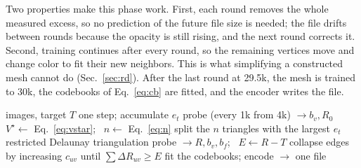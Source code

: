Two properties make this phase work. First, each round removes the whole measured excess, so no prediction of the future file size is needed; the file drifts between rounds because the opacity is still rising, and the next round corrects it. Second, training continues after every round, so the remaining vertices move and change color to fit their new neighbors. This is what simplifying a constructed mesh cannot do (Sec.~\ref{sec:rd}). After the last round at 29.5k, the mesh is trained to 30k, the codebooks of Eq.~\eqref{eq:cb} are fitted, and the encoder writes the file.

\begin{algorithm}[t]
\caption{\BM for a target file size $T$}
\label{alg:bm}
\small
\begin{algorithmic}[1]
\Require images, target $T$
  \State one \MS step; accumulate $e_t$
    \State probe (every 1k from 4k) $\rightarrow b_v, R_0$
    \State $V^\star \gets$ Eq.~\eqref{eq:vstar}; \ $n \gets$ Eq.~\eqref{eq:n}
    \State split the $n$ triangles with the largest $e_t$
  \EndIf
   restricted Delaunay triangulation \EndIf
    \State probe $\rightarrow R, b_v, b_f$; \ $E \gets R - T$
      \State collapse edges by increasing $c_{uv}$ until $\sum \Delta R_{uv} \ge E$
    \EndIf
  \EndIf
\EndFor
\State fit the codebooks; encode $\rightarrow$ one file
\end{algorithmic}
\end{algorithm}

